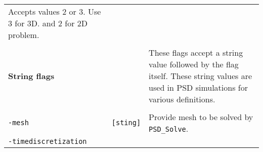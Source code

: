\begin{longtable}[]{@{}lll@{}}
\begin{minipage}[t]{0.56\columnwidth}
Accepts values 2 or 3. Use 3 for 3D. and 2 for 2D problem.\strut
\end{minipage}\tabularnewline
\begin{minipage}[t]{0.26\columnwidth}\raggedright\strut
\strut
\end{minipage} & \begin{minipage}[t]{0.09\columnwidth}\raggedright\strut
\strut
\end{minipage} & \begin{minipage}[t]{0.56\columnwidth}\raggedright\strut
\strut
\end{minipage}\tabularnewline
\begin{minipage}[t]{0.26\columnwidth}\raggedright\strut
\textbf{String flags}\strut
\end{minipage} & \begin{minipage}[t]{0.09\columnwidth}\raggedright\strut
\strut
\end{minipage} & \begin{minipage}[t]{0.56\columnwidth}\raggedright\strut
These flags accept a string value followed by the flag itself. These
string values are used in PSD simulations for various definitions.\strut
\end{minipage}\tabularnewline
\begin{minipage}[t]{0.26\columnwidth}\raggedright\strut
\strut
\end{minipage} & \begin{minipage}[t]{0.09\columnwidth}\raggedright\strut
\strut
\end{minipage} & \begin{minipage}[t]{0.56\columnwidth}\raggedright\strut
\strut
\end{minipage}\tabularnewline
\begin{minipage}[t]{0.26\columnwidth}\raggedright\strut
\lstinline!-mesh!\strut
\end{minipage} & \begin{minipage}[t]{0.09\columnwidth}\raggedright\strut
\lstinline![sting]!\strut
\end{minipage} & \begin{minipage}[t]{0.56\columnwidth}\raggedright\strut
Provide mesh to be solved by \lstinline!PSD_Solve!.\strut
\end{minipage}\tabularnewline
\begin{minipage}[t]{0.26\columnwidth}\raggedright\strut
\lstinline!-timediscretization!\strut
\end{minipage} & \begin{minipage}[t]{0.09\columnwidth}\raggedright\strut

\end{minipage}
\end{longtable}
